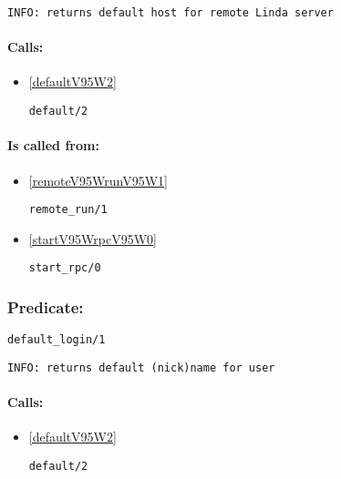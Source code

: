 {\small \begin{verbatim}
INFO: returns default host for remote Linda server

\end{verbatim}}
\paragraph{Calls:} 
\begin{itemize}
\item \ref{defaultV95W2} 
\begin{verbatim}
default/2
\end{verbatim}

\end{itemize}
\paragraph{Is called from:} 
\begin{itemize}
\item \ref{remoteV95WrunV95W1} 
\begin{verbatim}
remote_run/1
\end{verbatim}

\item \ref{startV95WrpcV95W0} 
\begin{verbatim}
start_rpc/0
\end{verbatim}

\end{itemize}

\subsubsection{Predicate:} \label{defaultV95WloginV95W1}

\begin{verbatim}
default_login/1
\end{verbatim}

{\small \begin{verbatim}
INFO: returns default (nick)name for user

\end{verbatim}}
\paragraph{Calls:} 
\begin{itemize}
\item \ref{defaultV95W2} 
\begin{verbatim}
default/2
\end{verbatim}

\end{itemize}

